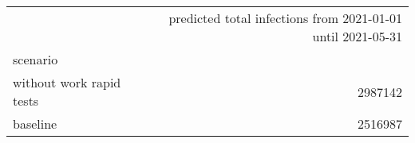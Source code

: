 \begin{tabular}{lr}
\toprule
{} &  predicted total infections from 2021-01-01 until 2021-05-31 \\
scenario                  &                                                              \\
\midrule
 without work rapid tests &                                            2987142 \\
 baseline                 &                                            2516987 \\
\bottomrule
\end{tabular}
